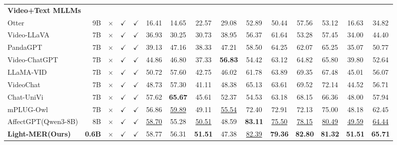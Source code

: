 \documentclass[sigconf]{acmart}
\begin{document}
\begin{table}[t]
{\begin{tabular}{lr|ccc|cccc|cccc|c|c}
        \midrule
        \multicolumn{15}{l}{\textbf{Video+Text MLLMs}} \\
        Otter \cite{Otter}           & 9B & $\times$     & $\checkmark$ & $\checkmark$ & 16.41 & 14.65 & 22.57 & 29.08 & 52.89 & 50.44 & 57.56 & 53.12 & 16.63 & 34.82 \\
        Video-LLaVA  \cite{video-llava}    & 7B & $\times$     & $\checkmark$ & $\checkmark$ & 36.93 & 30.25 & 30.73 & 38.95 & 56.37 & 61.64 & 53.28 & 57.45 & 34.00 & 44.40 \\
        PandaGPT \cite{su2023}        & 7B & $\times$     & $\checkmark$ & $\checkmark$ & 39.13 & 47.16 & 38.33 & 47.21 & 58.50 & 64.25 & 62.07 & 65.25 & 35.07 & 50.77 \\
        Video-ChatGPT \cite{video-chatgpt}   & 7B & $\times$     & $\checkmark$ & $\checkmark$ & 44.86 & 46.80 & 37.33 & \textbf{56.83} & 54.42 & 63.12 & 64.82 & 65.80 & 39.80 & 52.64 \\
        LLaMA-VID  \cite{llamavid}      & 7B & $\times$     & $\checkmark$ & $\checkmark$ & 50.72 & 57.60 & 42.75 & 46.02 & 61.78 & 63.89 & 69.35 & 67.48 & 45.01 & 56.07 \\
        VideoChat  \cite{videochat}      & 7B & $\times$     & $\checkmark$ & $\checkmark$ & 48.73 & 57.30 & 41.11 & 48.38 & 65.13 & 63.61 & 69.52 & 72.14 & 44.52 & 56.71 \\
        Chat-UniVi \cite{chatunivi}      & 7B & $\times$     & $\checkmark$ & $\checkmark$ & 57.62 & \textbf{65.67} & 45.61 & 52.37 & 54.53 & 63.18 & 68.15 & 66.36 & 48.00 & 57.94 \\
        mPLUG-Owl  \cite{mPLUG}      & 7B & $\times$     & $\checkmark$ & $\checkmark$ & 56.86 & \underline{59.89} & 49.11 & \underline{55.54} & 72.40 & 72.91 & 72.13 & 75.00 & 48.18 & 62.45 \\
        AffectGPT(Qwen3-8B) & 8B & $\times$ & $\checkmark$ & $\checkmark$ & \underline{58.70} & 55.28 & \underline{50.51} & 48.59 & \textbf{83.11} & \underline{75.50} & \underline{78.15} & \underline{80.49} & \underline{49.59} & \underline{64.44}\\
        \textbf{Light-MER(Ours)}  & \textbf{0.6B} & $\times$ & $\checkmark$ & $\checkmark$ & 58.77 & 56.31 & \textbf{51.51} & 47.38 & \underline{82.39} & \textbf{79.36} & \textbf{82.80} & \textbf{81.32} & \textbf{51.51} & \textbf{65.71} \\

\end{tabular}}
\end{table}
\end{document}
